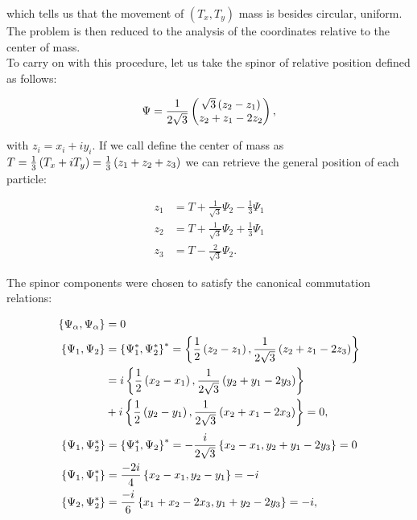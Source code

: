 which tells us that the movement of $(T_x,T_y)$ mass is besides circular, uniform. The problem is then reduced to the analysis of the coordinates relative to the center of mass.\\

To carry on with this procedure, let us take the spinor of relative position defined as follows:

\begin{align}
\Psi = \frac{1}{2\sqrt{3}}\begin{pmatrix}\sqrt{3}\left( z_{2}-z_{1} \right)\\
z_{2}+z_{1}-2z_{2}\end{pmatrix},
\label{eq:spinor}
\end{align}

with $z_{i} = x_i + iy_i$. If we call define the center of mass as $T = \frac{1}{3}\left( T_x + iT_y \right) = \frac{1}{3}\left( z_1 +z_2+z_3 \right)$ we can retrieve the general position of each particle:

\small
\begin{equation}
\begin{aligned}
z_1 &= T+\frac{1}{\sqrt{3}}\Psi_2 - \frac{1}{3}\Psi_1 \\
z_2 &= T+\frac{1}{\sqrt{3}}\Psi_2 + \frac{1}{3}\Psi_1 \\
z_3 &= T-\frac{2}{\sqrt{3}}\Psi_2.
\end{aligned}
\label{eq:singlevecs}
\end{equation}
\normalsize

The spinor components were chosen to satisfy the canonical commutation relations:

\begin{align*}
\left\lbrace \Psi_\alpha, \Psi_\alpha \right\rbrace &= 0\\
\left\lbrace \Psi_1, \Psi_2 \right\rbrace &= \left\lbrace \Psi_1^*, \Psi_2^* \right\rbrace^* = \left\lbrace \frac{1}{2}\left( z_{2}-z_{1} \right), \frac{1}{2\sqrt{3}}\left( z_{2}+z_{1}-2z_{3} \right) \right\rbrace \\
&= i\left\lbrace \frac{1}{2}\left( x_{2}-x_{1} \right), \frac{1}{2\sqrt{3}}\left( y_{2}+y_{1}-2y_{3} \right) \right\rbrace\\
&+ i\left\lbrace \frac{1}{2}\left( y_{2}-y_{1} \right), \frac{1}{2\sqrt{3}}\left( x_{2}+x_{1}-2x_{3} \right) \right\rbrace = 0,
\end{align*}
\small
\begin{align*}
\left\lbrace \Psi_1, \Psi_2^* \right\rbrace &= \left\lbrace \Psi_1^*, \Psi_2 \right\rbrace^* = -\frac{i}{2\sqrt{3}}\left\lbrace x_{2}-x_{1}, y_{2}+y_{1}-2y_{3} \right\rbrace = 0\\
\left\lbrace \Psi_1, \Psi_1^* \right\rbrace &= \frac{-2i}{4}\left\lbrace x_{2}-x_{1}, y_2-y_1 \right\rbrace = -i\\
\left\lbrace \Psi_2, \Psi_2^* \right\rbrace &= \frac{-i}{6}\left\lbrace x_{1}+x_{2}-2x_3, y_1+y_2-2y_3 \right\rbrace = -i,
\end{align*}
\normalsize

